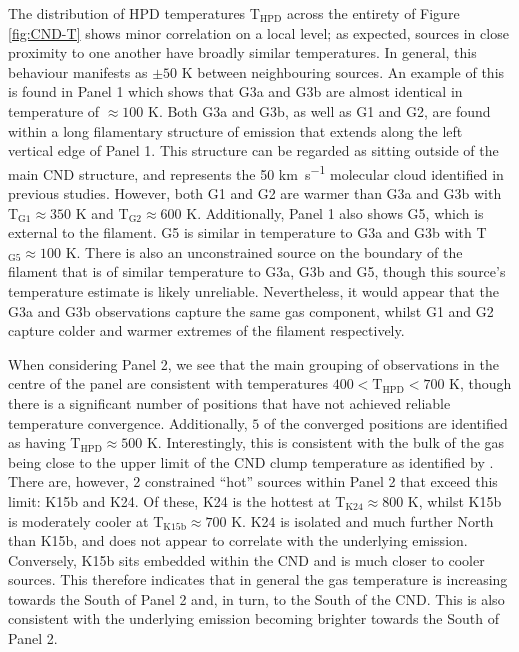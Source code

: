 \documentclass[twocolumn]{aastex631}
\begin{document}
The distribution of HPD temperatures T$_{\mathrm{HPD}}$ across the entirety of Figure \ref{fig:CND-T} shows minor correlation on a local level; as expected, sources in close proximity to one another have broadly similar temperatures. In general, this behaviour manifests as $\pm 50$ \si{\kelvin} between neighbouring sources. An example of this is found in Panel 1 which shows that G3a and G3b are almost identical in temperature of $\approx 100$ \si{\kelvin}. Both G3a and G3b, as well as G1 and G2, are found within a long filamentary structure of  emission that extends along the left vertical edge of Panel 1. This structure can be regarded as sitting outside of the main CND structure, and represents the 50 \si{\kilo\meter\per\second} molecular cloud identified in previous studies. However, both G1 and G2 are warmer than G3a and G3b with T$_{\mathrm{G1}} \approx 350$ \si{\kelvin} and T$_{\mathrm{G2}} \approx 600$ \si{\kelvin}. Additionally, Panel 1 also shows G5, which is external to the  filament. G5 is similar in temperature to G3a and G3b with T$_{\mathrm{G5}} \approx 100$ \si{\kelvin}. There is also an unconstrained source on the boundary of the filament that is of similar temperature to G3a, G3b and G5, though this source's temperature estimate is likely unreliable. Nevertheless, it would appear that the G3a and G3b observations capture the same gas component, whilst G1 and G2 capture colder and warmer extremes of the filament respectively. 

When considering Panel 2, we see that the main grouping of observations in the centre of the panel are consistent with temperatures $400 < \mathrm{T_{{HPD}}} < 700$ \si{\kelvin}, though there is a significant number of positions that have not achieved reliable temperature convergence. Additionally, $5$ of the converged positions are identified as having T$_{\mathrm{HPD}} \approx 500$ \si{\kelvin}. Interestingly, this is consistent with the bulk of the gas being close to the upper limit of the CND clump temperature as identified by \citet{cndClumpConditions}. There are, however, 2 constrained ``hot'' sources within Panel 2 that exceed this limit: K15b and K24. Of these, K24 is the hottest at T$_{\mathrm{K24}} \approx 800$ \si{\kelvin}, whilst K15b is moderately cooler at T$_{\mathrm{K15b}} \approx 700$ \si{\kelvin}. K24 is isolated and much further North than K15b, and does not appear to correlate with the underlying  emission. Conversely, K15b sits embedded within the CND and is much closer to cooler sources. This therefore indicates that in general the gas temperature is increasing towards the South of Panel 2 and, in turn, to the South of the CND. This is also consistent with the underlying  emission becoming brighter towards the South of Panel 2.
\end{document}
